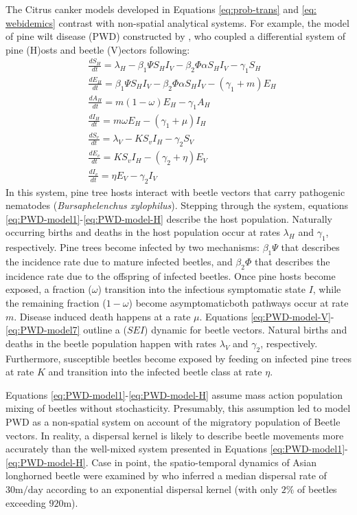 The Citrus canker models developed in Equations \ref{eq:prob-trans} and \ref{eq: webidemics} 
contrast with non-spatial analytical systems. For example, the model of pine wilt disease (PWD)
constructed by \cite{khan2020modelling}, who coupled a differential system of pine (H)osts and beetle (V)ectors 
following:
\begin{align}
    \label{eq:PWD-model1}
    &\frac{dS_H}{dt} = \lambda_H - \beta_1\Psi S_H I_V - \beta_2\Phi\alpha S_H I_V - \gamma_1 S_H \\
    &\frac{dE_H}{dt} = \beta_1\Psi S_H I_V - \beta_2\Phi\alpha S_H I_V  - (\gamma_1 + m)E_H \\
    &\frac{dA_H}{dt} = m(1 - \omega)E_H - \gamma_1 A_H \\
    \label{eq:PWD-model-H}
    &\frac{dI_H}{dt} = m \omega E_H - (\gamma_1 + \mu ) I_H \\
    \label{eq:PWD-model-V}
    &\frac{dS_v}{dt} = \lambda_V - K S_v I_H - \gamma_2 S_V \\
    &\frac{dE_v}{dt} = K S_v I_H - (\gamma_2 + \eta) E_V \\
    \label{eq:PWD-model7}
    &\frac{dI_v}{dt} = \eta E_V - \gamma_2 I_V
\end{align}
In this system, pine tree hosts interact with beetle vectors that carry pathogenic nematodes 
(\textit{Bursaphelenchus xylophilus}). 
Stepping through the system, equations \ref{eq:PWD-model1}-\ref{eq:PWD-model-H} describe the host population.
Naturally occurring births and deaths in the host population occur at rates $\lambda_H$ and $\gamma_1$, 
respectively. Pine trees become infected by two mechanisms: $\beta_1\Psi$ that describes the incidence
rate due to mature infected beetles, and $\beta_2\Phi$ that describes the incidence rate due to the offspring
of infected beetles.
Once pine hosts become exposed, a fraction ($\omega$) transition into the infectious symptomatic state $I$, 
while the remaining fraction ($1 -\omega$) become asymptomatic\textemdash both pathways occur at rate $m$. 
Disease induced death happens at a rate $\mu$. Equations \ref{eq:PWD-model-V}-\ref{eq:PWD-model7} outline a 
($SEI$) dynamic for beetle vectors. Natural births and deaths in the beetle population happen with rates 
$\lambda_V$ and $\gamma_2$, respectively. Furthermore, susceptible beetles become exposed by feeding on
infected pine trees at rate $K$ and transition into the infected beetle class at rate $\eta$.

Equations \ref{eq:PWD-model1}-\ref{eq:PWD-model-H} assume mass action population mixing of beetles 
without stochasticity. Presumably, this assumption led \cite{khan2020modelling} to model PWD as a non-spatial
system on account of the migratory population of Beetle vectors. In reality, a dispersal kernel is likely to 
describe beetle movements more accurately than the well-mixed system presented in Equations 
\ref{eq:PWD-model1}-\ref{eq:PWD-model-H}. Case in point, the spatio-temporal dynamics of Asian longhorned
beetle were examined by \cite{smith2004dispersal} who inferred a median dispersal rate of $30\mathrm{m/day}$
according to an exponential dispersal kernel (with only $2\%$ of beetles exceeding $920\mathrm{m}$).

